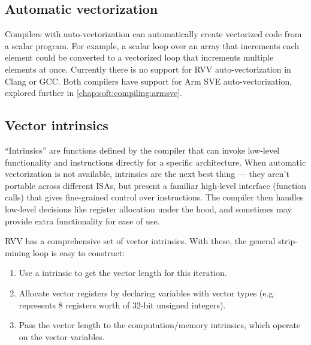 \documentclass[../thesis]{subfiles}
\begin{document}
\subsection{Automatic vectorization}
Compilers with auto-vectorization can automatically create vectorized code from a scalar program.
For example, a scalar loop over an array that increments each element could be converted to a vectorized loop that increments multiple elements at once.
Currently there is no support for RVV auto-vectorization in Clang or GCC.
Both compilers have support for Arm SVE auto-vectorization, explored further in \cref{chap:soft:compiling:armsve}.

\subsection{Vector intrinsics}
\enquote{Intrinsics} are functions defined by the compiler that can invoke low-level functionality and instructions directly for a specific architecture.
When automatic vectorization is not available, intrinsics are the next best thing --- they aren't portable across different ISAs, but present a familiar high-level interface (function calls) that gives fine-grained control over instructions.
The compiler then handles low-level decisions like register allocation under the hood, and sometimes may provide extra functionality for ease of use.

RVV has a comprehensive set of vector intrinsics\cite{specification-RVV-intrinsics}.
With these, the general strip-mining loop is easy to construct:
\begin{enumerate}
    \item Use a  intrinsic to get the vector length for this iteration.
    \item Allocate vector registers by declaring variables with vector types (e.g.  represents 8 registers worth of 32-bit unsigned integers).
    \item Pass the vector length to the computation/memory intrinsics, which operate on the vector variables.
\end{enumerate}
\end{document}
